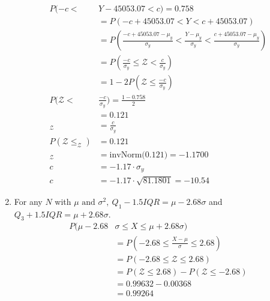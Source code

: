 \documentclass{article}
\begin{document}
\begin{enumerate}[label=\alph*)]
\begin{align*}
              P(-c <                                 & Y-45053.07 < c)              = 0.758                                                                   \\
                                                     & = P(-c + 45053.07 < Y < c + 45053.07)                                                                  \\
                                                     & = P(\frac{-c+45053.07-\mu_y}{\sigma_y} < \frac{Y-\mu_y}{\sigma_y} < \frac{c+45053.07-\mu_y}{\sigma_y}) \\
                                                     & = P(\frac{-c}{\sigma_y} \leq \mathcal{Z} < \frac{c}{\sigma_y})                                         \\
                                                     & = 1 - 2P(\mathcal{Z} \leq \frac{-c}{\sigma_y})                                                         \\
              P(\mathcal{Z}<                         & \frac{-c}{\sigma_y})      = \frac{1-0.758}{2}                                                          \\
                                                     & =                                  0.121                                                               \\
              _{\mathcal{Z}}                         & = \frac{c}{\sigma_y}                                                                                   \\
              P(\mathcal{Z\leq_{\mathcal{Z}}})       & = 0.121                                                                                                \\
              _{\mathcal{Z}} & = \text{invNorm(0.121)} = -1.1700                                                                                              \\
              c                                      & = -1.17 \cdot \sigma_y                                                                                 \\
              c                                      & = -1.17 \cdot \sqrt{81.1801} = -10.54
          \end{align*}
    \item For any \(N\) with \(\mu \text{ and } \sigma^2,\ Q_1 - 1.5IQR = \mu - 2.68 \sigma\) and \(Q_3 + 1.5IQR = \mu + 2.68 \sigma\).
          \begin{align*}
              P(\mu - 2.68 & \sigma \leq X \leq \mu + 2.68 \sigma) \\
              & = P(-2.68 \leq \frac{X-\mu}{\sigma} \leq 2.68)     \\
              & = P(-2.68 \leq \mathcal{Z} \leq 2.68)               \\
              & = P(\mathcal{Z} \leq 2.68) - P(\mathcal{Z} \leq -2.68) \\ 
              & = 0.99632 - 0.00368          \\
              & = 0.99264
          \end{align*}
\end{enumerate}
\end{document}
